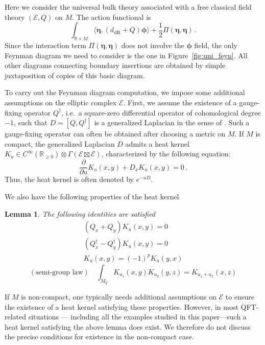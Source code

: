\documentclass[11pt]{article}
\newcommand{\R}{\mathbb{R}}
\newcommand{\derham}{\mathrm{dR}}
\numberwithin{equation}{section}
\newtheorem{lemma}{Lemma}[section]
\begin{document}
Here we consider the universal bulk theory associated with a free classical field theory $(\mathcal{E},Q)$ on $M$. The action functional is
\begin{equation}
	\int_{\R\times M}\langle \boldsymbol{\eta}, (d_{\derham} + Q)\boldsymbol{\phi} \rangle + \frac{1}{2}\Pi(\boldsymbol{\eta},\boldsymbol{\eta})\,.
\end{equation}
Since the interaction term $\Pi(\boldsymbol{\eta},\boldsymbol{\eta})$ does not involve the $\boldsymbol{\phi}$ field, the only Feynman diagram we need to consider is the one in Figure~\ref{fig:uni_feyn}. All other diagrams connecting boundary insertions are obtained by simple juxtaposition of copies of this basic diagram.

To carry out the Feynman diagram computation, we impose some additional assumptions on the elliptic complex $\mathcal{E}$. First, we assume the existence of a gauge-fixing operator $Q^{\dagger}$, i.e.\ a square-zero differential operator of cohomological degree $-1$, such that $D=[Q,Q^{\dagger}]$ is a generalized Laplacian in the sense of \cite{berline1992heat}. Such a gauge-fixing operator can often be obtained after choosing a metric on $M$. If $M$ is compact, the generalized Laplacian $D$ admits a heat kernel $K_u\in C^{\infty}(\R_{\geq 0})\otimes \Gamma(\mathcal{E}\boxtimes \mathcal{E})$, characterized by the following equation:
\begin{equation}
	\frac{\partial}{\partial u}K_u(x,y) + D_x K_u(x,y) = 0\,.
\end{equation}
Thus, the heat kernel is often denoted by $e^{-uD}$.

We also have the following properties of the heat kernel \cite{costello2011re,berline1992heat}
\begin{lemma}
	The following identities are satisfied
	\begin{equation}
		\begin{aligned}
			(Q_x + Q_y)K_u(x,y) = 0\\
			(Q^\dagger_x - Q^{\dagger}_y)K_u(x,y) = 0\\
			K_u(x,y) = (-1)^pK_u(y,x)
		\end{aligned}
	\end{equation}
	\begin{equation}
		(\text{semi-group law})\quad \int_{M_y}K_{u_1}(x,y)K_{u_2}(y,z) = K_{u_1+u_2}(x,z) 
	\end{equation}
\end{lemma}
If $M$ is non-compact, one typically needs additional assumptions on $\mathcal{E}$ to ensure the existence of a heat kernel satisfying these properties. However, in most QFT-related situations — including all the examples studied in this paper—such a heat kernel satisfying the above lemma does exist. We therefore do not discuss the precise conditions for existence in the non-compact case.
\end{document}
